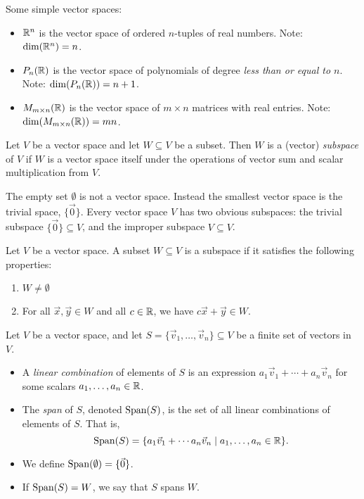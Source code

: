 \begin{examples}
	Some simple vector spaces:
	\begin{itemize}
		\item ${\mathbb{R}}^n$ is the vector space of ordered $n$-tuples of real numbers.
			Note: $\dim({\mathbb{R}}^n) = n$.
		\item $P_n({\mathbb{R}})$ is the vector space of polynomials of degree \emph{less
			than or equal to $n$}. Note: $\dim(P_n({\mathbb{R}})) = n + 1$.
		\item $M_{m \times n}({\mathbb{R}})$ is the vector space of $m \times n$ matrices with
			real entries. Note: $\dim(M_{m \times n}({\mathbb{R}})) = mn$.
	\end{itemize}
\end{examples}

\begin{definition}
	Let $V$ be a vector space and let $W \subseteq V$ be a subset. Then $W$ is a
	(vector) \emph{subspace} of $V$ if $W$ is a vector space itself under the
	operations of vector sum and scalar multiplication from $V$.
\end{definition}

\begin{notes}
	The empty set $\emptyset$ is not a vector space. Instead the smallest vector
	space is the trivial space, $\{\vec{0}\}$. Every vector space $V$ has two
	obvious subspaces: the trivial subspace $\{\vec{0}\} \subseteq V$, and the
	improper subspace $V \subseteq V$.
\end{notes}

\begin{theorem}
	Let $V$ be a vector space. A subset $W \subseteq V$ is a subspace if it
	satisfies the following properties:
	\begin{enumerate}
		\item $W \neq \emptyset$
		\item For all $\vec{x}, \vec{y} \in W$ and all $c \in {\mathbb{R}}$, we have $c\vec{x} +
			\vec{y} \in W$.
	\end{enumerate}
\end{theorem}

\begin{definition}
	Let $V$ be a vector space, and let $S = \{\vec{v}_1, \dots, \vec{v}_n\}
	\subseteq V$ be a finite set of vectors in $V$.
	\begin{itemize}
		\item A \emph{linear combination} of elements of $S$ is an expression $a_1
			\vec{v}_1 + \cdots + a_n \vec{v}_n$ for some scalars $a_1, \dots, a_n
			\in {\mathbb{R}}$.
		\item The \emph{span} of $S$, denoted $\text{Span}(S)$, is the set of all linear
			combinations of elements of $S$. That is, \[\text{Span}(S) = \{a_1 \vec{v}_1
			+ \cdots a_n \vec{v}_n \mid a_1, \dots, a_n \in {\mathbb{R}}\}.\]
		\item We define $\text{Span}(\emptyset) = \{\vec{0}\}$.
		\item If $\text{Span}(S) = W$, we say that $S$ spans $W$.
	\end{itemize}
\end{definition}

